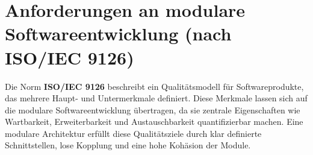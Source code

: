 \section{Anforderungen an modulare Softwareentwicklung (nach ISO/IEC 9126)}
\label{sec:anforderungen-an-modulare-softwareentwicklung-(nach-iso/iec-9126)}

Die Norm \textbf{ISO/IEC 9126} beschreibt ein Qualitätsmodell für Softwareprodukte, das mehrere Haupt- und Untermerkmale definiert.
Diese Merkmale lassen sich auf die modulare Softwareentwicklung übertragen, da sie zentrale Eigenschaften wie Wartbarkeit, Erweiterbarkeit und Austauschbarkeit quantifizierbar machen.
Eine modulare Architektur erfüllt diese Qualitätsziele durch klar definierte Schnittstellen, lose Kopplung und eine hohe Kohäsion der Module.\cite{ISOIEC9126-1991}

